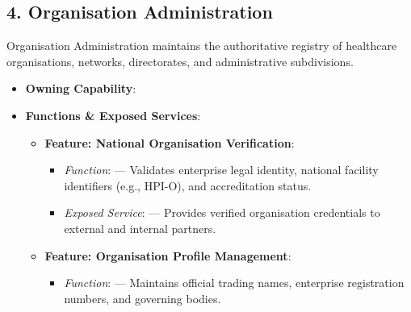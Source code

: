 \label{rad:em:112}

\par\smallskip
{}\label{rad:em:114}
\subsection*{4. Organisation Administration}
\label{rad:em:116}

Organisation Administration maintains the authoritative registry of healthcare organisations, networks, directorates, and administrative subdivisions.

\label{rad:em:118}

\begin{itemize}

\item 
\textbf{Owning Capability}: \texttt{}



\item 
\textbf{Functions \& Exposed Services}:


\begin{itemize}

\item 
\textbf{Feature: National Organisation Verification}:


\begin{itemize}

\item 
\emph{Function}: \texttt{} — Validates enterprise legal identity, national facility identifiers (e.g., HPI-O), and accreditation status.



\item 
\emph{Exposed Service}: \texttt{} — Provides verified organisation credentials to external and internal partners.



\end{itemize}


\item 
\textbf{Feature: Organisation Profile Management}:


\begin{itemize}

\item 
\emph{Function}: \texttt{} — Maintains official trading names, enterprise registration numbers, and governing bodies.




\end{itemize}
\end{itemize}
\end{itemize}
